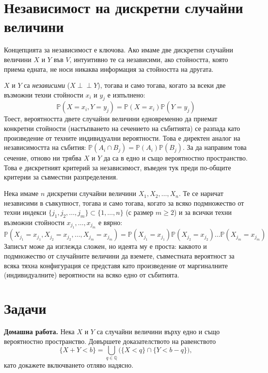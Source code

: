 \section{Независимост на дискретни случайни величини}

Концепцията за независимост е ключова. Ако имаме две дискретни случайни величини $X$ и $Y$ във $V$, интуитивно те са независими, ако стойността, която приема едната, не носи никаква информация за стойността на другата.

\begin{defn}\label{crit:discrete-independence}
$X$ и $Y$ са \emph{независими} ($X \perp\!\!\!\perp Y$), тогава и само тогава, когато за всеки две възможни техни стойности $x_i$ и $y_j$ е изпълнено:
\[ \mathbb{P}(X = x_i, Y = y_j) = \mathbb{P}(X = x_i) \mathbb{P}(Y = y_j) \]
Тоест, вероятността двете случайни величини едновременно да приемат конкретни стойности (настъпването на сечението на събитията) се разпада като произведение от техните индивидуални вероятности. Това е директен аналог на независимостта на събития: $\mathbb{P}(A_i \cap B_j) = \mathbb{P}(A_i)\mathbb{P}(B_j)$. За да направим това сечение, отново ни трябва $X$ и $Y$ да са в едно и също вероятностно пространство. Това е дискретният критерий за независимост, въведен тук преди по-общите критерии за съвместни разпределения.
\end{defn}

\begin{defn}
Нека имаме $n$ дискретни случайни величини $X_1, X_2, \dots, X_n$. Те се наричат независими в съвкупност, тогава и само тогава, когато за всяко подмножество от техни индекси $\{j_1, j_2, \dots, j_m\} \subset \{1, \dots, n\}$ (с размер $m \ge 2$) и за всички техни възможни стойности $x_{j_1}, \dots, x_{j_m}$ е вярно:
\[ \mathbb{P}(X_{j_1} = x_{j_1}, X_{j_2} = x_{j_2}, \dots, X_{j_m} = x_{j_m}) = \mathbb{P}(X_{j_1} = x_{j_1}) \mathbb{P}(X_{j_2} = x_{j_2}) \dots \mathbb{P}(X_{j_m} = x_{j_m}) \]
Записът може да изглежда сложен, но идеята му е проста: каквото и подмножество от случайните величини да вземете, съвместната вероятност за всяка тяхна конфигурация се представя като произведение от маргиналните (индивидуалните) вероятности на всяко едно от събитията.
\end{defn}

\section{Задачи}

\textbf{Домашна работа.} Нека $X$ и $Y$ са случайни величини върху едно и също вероятностно пространство. Довършете доказателството на равенството
\[
\{X+Y<b\}
=\bigcup_{q\in\mathbb{Q}}\bigl(\{X<q\}\cap\{Y<b-q\}\bigr),
\]
като докажете включването отляво надясно.
